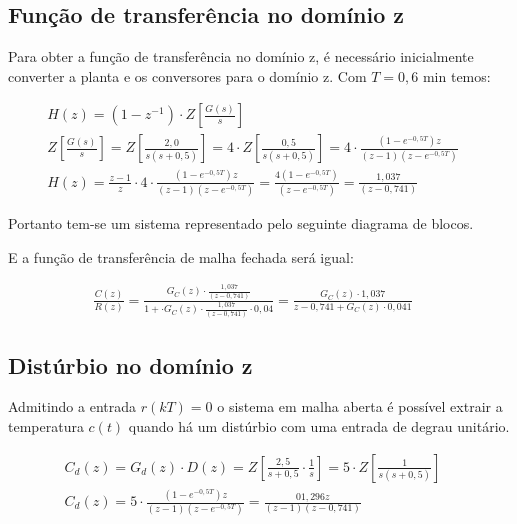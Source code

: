 \documentclass[a4paper,12pt]{article}
\begin{document}
		\subsection{Função de transferência no domínio z}
			Para obter a função de transferência no domínio z, é necessário inicialmente converter a planta e os conversores para o domínio z. Com $T=0,6$ min temos:
		
			\begin{equation}
				\left.
				\begin{array}{c}
					\displaystyle H(z) = (1 - z^{-1}) \cdot Z\left[\frac{G(s)}{s}\right] \\[20pt]
					
					\displaystyle Z\left[\frac{G(s)}{s}\right] = Z\left[\frac{2,0}{s(s+0,5)}\right] = 4 \cdot Z\left[\frac{0,5}{s(s+0,5)}\right] = 4 \cdot \frac{(1 - e^{-0,5T})z}{(z-1)(z-e^{-0,5T})} \\[20pt]
					\displaystyle H(z) = \frac{z-1}{z} \cdot 4 \cdot \frac{(1 - e^{-0,5T})z}{(z-1)(z-e^{-0,5T})} = \frac{4(1 - e^{-0,5T})}{(z-e^{-0,5T})} = \frac{1,037}{(z-0,741)}
				\end{array}
				\right.
				\quad 
				\label{eq:hz06}
			\end{equation}
			
			Portanto tem-se um sistema representado pelo seguinte diagrama de blocos.
			
			
			E a função de transferência de malha fechada será igual:
			
			\begin{equation}
				\left.
				\begin{array}{c}
					\displaystyle \frac{C(z)}{R(z)} = \frac{G_C(z) \cdot \displaystyle \frac{1,037}{(z-0,741)}}{1 + \cdot G_C(z) \cdot \displaystyle \frac{1,037}{(z-0,741)} \cdot 0,04} = \frac{G_C(z) \cdot 1,037}{z - 0,741 + G_C(z) \cdot 0,041}
				\end{array}
				\right.
				\quad 
				\label{eq:ftma}
			\end{equation}
		
		\subsection{Distúrbio no domínio z}
			Admitindo a entrada $r(kT)=0$ o sistema em malha aberta é possível extrair a temperatura $c(t)$ quando há um distúrbio com uma entrada de degrau unitário. 
			
			\begin{equation}
				\left.
				\begin{array}{c}
					\displaystyle C_d(z) = G_d(z) \cdot D(z) = Z\left[\frac{2,5}{s+0,5} \cdot \frac{1}{s} \right] = 5 \cdot Z\left[\frac{1}{s(s+0,5)} \right] \\[20pt]
					\displaystyle C_d(z) = 5 \cdot \frac{(1 - e^{-0,5T})z}{(z-1)(z-e^{-0,5T})} = \frac{01,296z}{(z-1)(z-0,741)}
				\end{array}
				\right.
				\quad 
			\end{equation}
			
\end{document}
